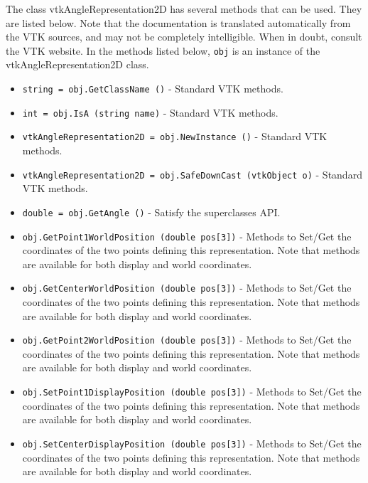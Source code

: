 The class vtkAngleRepresentation2D has several methods that can be used.
  They are listed below.
Note that the documentation is translated automatically from the VTK sources,
and may not be completely intelligible.  When in doubt, consult the VTK website.
In the methods listed below, \verb|obj| is an instance of the vtkAngleRepresentation2D class.
\begin{itemize}
\item  \verb|string = obj.GetClassName ()| -  Standard VTK methods.

\item  \verb|int = obj.IsA (string name)| -  Standard VTK methods.

\item  \verb|vtkAngleRepresentation2D = obj.NewInstance ()| -  Standard VTK methods.

\item  \verb|vtkAngleRepresentation2D = obj.SafeDownCast (vtkObject o)| -  Standard VTK methods.

\item  \verb|double = obj.GetAngle ()| -  Satisfy the superclasses API.

\item  \verb|obj.GetPoint1WorldPosition (double pos[3])| -  Methods to Set/Get the coordinates of the two points defining
 this representation. Note that methods are available for both
 display and world coordinates.

\item  \verb|obj.GetCenterWorldPosition (double pos[3])| -  Methods to Set/Get the coordinates of the two points defining
 this representation. Note that methods are available for both
 display and world coordinates.

\item  \verb|obj.GetPoint2WorldPosition (double pos[3])| -  Methods to Set/Get the coordinates of the two points defining
 this representation. Note that methods are available for both
 display and world coordinates.

\item  \verb|obj.SetPoint1DisplayPosition (double pos[3])| -  Methods to Set/Get the coordinates of the two points defining
 this representation. Note that methods are available for both
 display and world coordinates.

\item  \verb|obj.SetCenterDisplayPosition (double pos[3])| -  Methods to Set/Get the coordinates of the two points defining
 this representation. Note that methods are available for both
 display and world coordinates.


\end{itemize}
